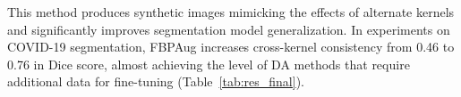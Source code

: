 This method produces synthetic images mimicking the effects of alternate kernels and significantly improves segmentation model generalization. In experiments on COVID-19 segmentation, FBPAug increases cross-kernel consistency from 0.46 to 0.76 in Dice score, almost achieving the level of DA methods that require additional data for fine-tuning (Table~\ref{tab:res_final}).



%			
%			
%			
%			
%			
%			
%			
%			
%			
%			
%			
%			
%			
%			
%			
%			
%			
%			

